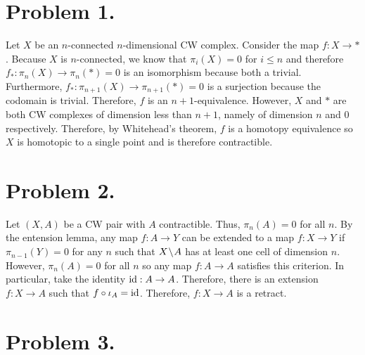 \documentclass[12pt]{extarticle}
\begin{document}
 
\section*{Problem 1.}

Let $X$ be an $n$-connected $n$-dimensional CW complex. Consider the map $f : X \to \ast$. Because $X$ is $n$-connected, we know that $\pi_i(X) = 0$ for $i \le n$ and therefore $f_* : \pi_n(X) \to \pi_n(\ast) = 0$ is an isomorphism because both a trivial. Furthermore, $f_* : \pi_{n + 1}(X) \to \pi_{n + 1}(\ast) = 0$ is a surjection because the codomain is trivial. Therefore, $f$ is an $n+1$-equivalence. However, $X$ and $\ast$ are both CW complexes of dimension less than $n + 1$, namely of dimension $n$ and $0$ respectively. Therefore, by Whitehead's theorem, $f$ is a homotopy equivalence so $X$ is homotopic to a single point and is therefore contractible.  

\section*{Problem 2.}

Let $(X, A)$ be a CW pair with $A$ contractible. Thus, $\pi_n(A) = 0$ for all $n$. By the entension lemma, any map $f : A \to Y$ can be extended to a map $f : X \to Y$ if $\pi_{n-1}(Y) = 0$ for any $n$ such that $X \! \setminus \! A$ has at least one cell of dimension $n$. However, $\pi_{n}(A) = 0$ for all $n$ so any map $f : A \to A$ satisfies this criterion. In particular, take the identity $\mathrm{id} : A \to A$. Therefore, there is an extension $f : X \to A$ such that $f \circ \iota_A = \mathrm{id}$. Therefore, $f : X \to A$ is a retract.

\section*{Problem 3.}
\end{document}
